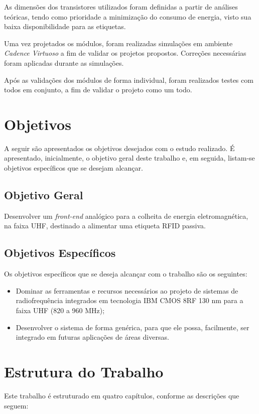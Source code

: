 As dimensões dos transistores utilizados foram definidas a partir de análises teóricas, tendo como prioridade a minimização do consumo de energia, visto sua baixa disponibilidade para as etiquetas.

Uma vez projetados os módulos, foram realizadas simulações em ambiente \textit{Cadence Virtuoso} a fim de validar os projetos propostos. Correções necessárias foram aplicadas durante as simulações.

Após as validações dos módulos de forma individual, foram realizados testes com todos em conjunto, a fim de validar o projeto como um todo.


\section{Objetivos}
A seguir são apresentados os objetivos desejados com o estudo realizado. É apresentado, inicialmente, o objetivo geral deste trabalho e, em seguida, listam-se objetivos específicos que se desejam alcançar.

\subsection{Objetivo Geral}
Desenvolver um \textit{front-end} analógico para a colheita de energia eletromagnética, na faixa UHF, destinado a alimentar uma etiqueta RFID passiva.

\subsection{Objetivos Específicos}
Os objetivos específicos que se deseja alcançar com o trabalho são os seguintes:

\begin{itemize}
	\item Dominar as ferramentas e recursos necessários ao projeto de sistemas de radiofrequência integrados em tecnologia IBM CMOS 8RF 130 nm para a faixa UHF (820 a 960 MHz);
	\item Desenvolver o sistema de forma genérica, para que ele possa, facilmente, ser integrado em futuras aplicações de áreas diversas.
\end{itemize}


\section{Estrutura do Trabalho}
Este trabalho é estruturado em quatro capítulos, conforme as descrições que seguem:

